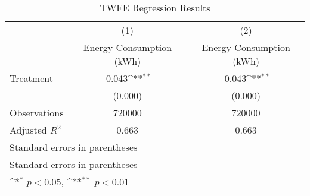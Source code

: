 \begin{table}[htbp]\centering
\def\sym#1{\ifmmode^{#1}\else\(^{#1}\)\fi}
\caption{TWFE Regression Results}
\begin{tabular}{l*{2}{c}}
\hline\hline
                    &\multicolumn{1}{c}{(1)}&\multicolumn{1}{c}{(2)}\\
                    &\multicolumn{1}{c}{Energy Consumption (kWh)}&\multicolumn{1}{c}{Energy Consumption (kWh)}\\
\hline
Treatment           &      -0.043\sym{**}&      -0.043\sym{**}\\
                    &     (0.000)        &     (0.000)        \\
\hline
Observations        &      720000        &      720000        \\
Adjusted \(R^{2}\)  &       0.663        &       0.663        \\
\hline\hline
\multicolumn{3}{l}{\footnotesize Standard errors in parentheses}\\
\multicolumn{3}{l}{\footnotesize Standard errors in parentheses}\\
\multicolumn{3}{l}{\footnotesize \sym{*} \(p<0.05\), \sym{**} \(p<0.01\)}\\
\end{tabular}
\end{table}
